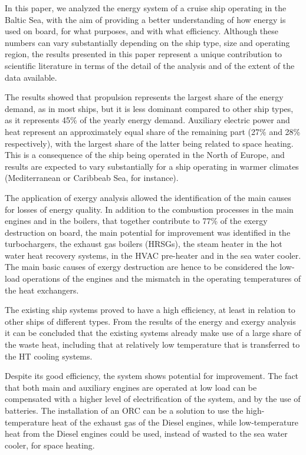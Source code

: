\documentclass[preprint,12pt]{elsarticle}
\begin{document}
In this paper, we analyzed the energy system of a cruise ship operating in the Baltic Sea, with the aim of providing a better understanding of how energy is used on board, for what purposes, and with what efficiency. Although these numbers can vary substantially depending on the ship type, size and operating region, the results presented in this paper represent a unique contribution to scientific literature in terms of the detail of the analysis and of the extent of the data available. 

The results showed that propulsion represents the largest share of the energy demand, as in most ships, but it is less dominant compared to other ship types, as it represents 45\% of the yearly energy demand. Auxiliary electric power and heat represent an approximately equal share of the remaining part (27\% and 28\% respectively), with the largest share of the latter being related to space heating. This is a consequence of the ship being operated in the North of Europe, and results are expected to vary substantially for a ship operating in warmer climates (Mediterranean or Caribbeab Sea, for instance).

The application of exergy analysis allowed the identification of the main causes for losses of energy quality. In addition to the combustion processes in the main engines and in the boilers, that together contribute to 77\% of the exergy destruction on board, the main potential for improvement was identified in the turbochargers, the exhaust gas boilers (HRSGs), the steam heater in the hot water heat recovery systems, in the HVAC pre-heater and in the sea water cooler. The main basic causes of exergy destruction are hence to be considered the low-load operations of the engines and the mismatch in the operating temperatures of the heat exchangers. 

The existing ship systems proved to have a high efficiency, at least in relation to other ships of different types. From the results of the energy and exergy analysis it can be concluded that the existing systems already make use of a large share of the waste heat, including that at relatively low temperature that is transferred to the HT cooling systems. 

Despite its good efficiency, the system shows potential for improvement. The fact that both main and auxiliary engines are operated at low load can be compensated with a higher level of electrification of the system, and by the use of batteries. The installation of an ORC can be a solution to use the high-temperature heat of the exhaust gas of the Diesel engines, while low-temperature heat from the Diesel engines could be used, instead of wasted to the sea water cooler, for space heating. 
\end{document}
